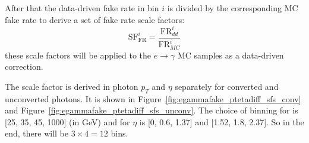After that the data-driven fake rate in bin $i$ is divided by the corresponding MC fake rate to derive a set of fake rate scale factors:
\begin{equation}
\text{SF}_{\text{FR}}^i = \frac{\text{FR}_{dd}^i}{\text{FR}_{MC}^i}
\end{equation}
these scale factors will be applied to the $e\to\gamma$ MC samples as a data-driven correction.

The scale factor is derived in photon $p_T$ and $\eta$ separately for converted and unconverted photons. It is shown in Figure~\ref{fig:egammafake_ptetadiff_sfs_conv} and Figure~\ref{fig:egammafake_ptetadiff_sfs_unconv}. The choice of binning for \pt is [25, 35, 45, 1000] (in GeV) and for $\eta$ is [0, 0.6, 1.37] and [1.52, 1.8, 2.37]. So in the end, there will be $3\times4 = 12$ bins.



